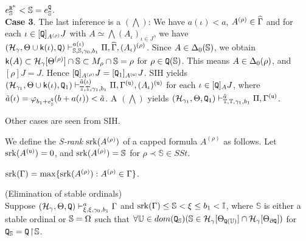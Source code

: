 \documentclass{article}
\newcommand{\mS}{\mathbb{S}}
\newcommand{\mI}{\mathbb{I}}
\newcommand{\mT}{\mathbb{T}}
\newcommand{\mU}{\mathbb{U}}
\begin{document}
$e^{{\tt R}^{\kap}}_{\mS}<\mS=e^{{\tt Q}}_{\mS}$.
\\
\textbf{Case 3}.
The last inference is a $(\bigwedge)$:
We have $a(\iota)<a$, $A^{(\rho)}\in\widehat{\Gamma}$ and for each 
$\iota\in [{\tt Q}]_{A^{(\rho)}}J$ with
$A\simeq\bigwedge(A_{\iota})_{\iota\in J}$, we have
$
(\mathcal{H}_{\gamma},\Tht\cup\sfk(\iota),{\tt Q})
\vdash^{a(\iota)}_{\mS,\mS,\gam_{0},b_{1}}
\Pi,\widehat{\Gam},(A_{\iota})^{(\rho)}
$.
Since $A\in\Del_{0}(\mS)$, we obtain $\sfk(A)\subset\calh_{\gam}[\Tht^{(\rho)}]\cap\mS\subset
M_{\rho}\cap\mS=\rho$ for $\rho\in{\tt Q}(\mS)$.
This means 
$A\in\Delta_{0}(\rho)$, and
$[\rho]J=J$. Hence
$[{\tt Q}]_{A^{(\rho)}}J=[{\tt Q}_{1}]_{A^{({\tt u})}}J$.
SIH yields
$
(\mathcal{H}_{\gam_{1}},\Tht\cup\sfk(\iota),{\tt Q}_{1})
\vdash^{\tilde{a}(\iota)}_{\mT,\mT,\gam_{1},b_{1}}
\Pi,\Gam^{({\tt u})},(A_{\iota})^{({\tt u})}
$
for each $\iota\in [{\tt Q}]_{A}J$, where $\tilde{a}(\iota)=\vphi_{b_{1}+e^{{\tt Q}}_{\mS}}(b+a(\iota))<\tilde{a}$.
A $(\bigwedge)$ yields
$
(\mathcal{H}_{\gam_{1}},\Tht,{\tt Q}_{1})
\vdash^{\tilde{a}}_{\mT,\mT,\gam_{1},b_{1}}
\Pi,\Gam^{({\tt u})}
$.

Other cases are seen from SIH.
\eprf

\bdf\label{df:srank}
{\rm
We define the \textit{S-rank} ${\rm srk}(A^{(\rho)})$ of a capped formula $A^{(\rho)}$ as follows.
Let ${\rm srk}(A^{({\tt u})})=0$, and
${\rm srk}(A^{(\rho)})=\mS$ for $\rho\prec\mS\in SSt$.

${\rm srk}(\Gamma)=\max\{{\rm srk}(A^{(\rho)}): A^{(\rho)}\in\Gamma\}$.
}
\edf



\blem\label{lem:main.1}{\rm (Elimination of stable ordinals)}\\
Suppose
$
(\mathcal{H}_{\gamma},\Theta,{\tt Q})
\vdash^{a}_{\xi,\xi,\gamma_{0},b_{1}}
\Gamma
$ and
${\rm srk}(\Gam)\leq\mS<\xi\leq b_{1}<\mI$, where $\mS$ is either a stable ordinal or $\mS=\Ome$ such that
$\fal\mU\in dom({\tt Q}_{\mS})(\mS\in\calh_{\gam}[\Tht_{{\tt Q}(\mU)}]\cap\calh_{\gam}[\Tht_{\partial{\tt Q}}])$ for ${\tt Q}_{\mS}={\tt Q}\restrict\mS$.
\end{document}
